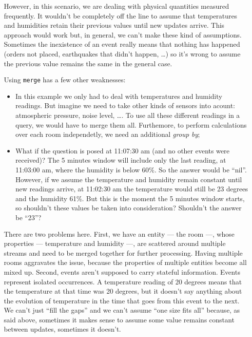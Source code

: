 \documentclass{report}
\begin{document}
However, in this scenario, we are dealing with physical quantities
measured frequently. It wouldn't be completely off the line to assume
that temperatures and humidities retain their previous values until
new updates arrive. This approach would work but, in general, we can't
make these kind of assumptions. Sometimes the inexistence of an event
really means that nothing has happened (orders not placed, earthquakes
that didn't happen, \ldots) so it's wrong to assume the previous value
remains the same in the general case.

Using \verb=merge= has a few other weaknesses:

\begin{itemize}
\item In this example we only had to deal with temperatures and
  humidity readings. But imagine we need to take other kinds of
  sensors into acount: atmospheric pressure, noise level, \ldots. To
  use all these different readings in a query, we would have to merge
  them all. Furthemore, to perform calculations over each room
  independetly, we need an additional \emph{group by};
\item What if the question is posed at 11:07:30 am (and no other
  events were received)? The 5 minutes window will include only the
  last reading, at 11:03:00 am, where the humidity is below 60\%. So
  the answer would be ``nil''. However, if we assume the temperature
  and humidity remain constant until new readings arrive, at 11:02:30
  am the temperature would still be 23 degrees and the humidity
  61\%. But this is the moment the 5 minutes window starts, so
  shouldn't these values be taken into consideration? Shouldn't the
  answer be ``23''?
\end{itemize}

There are two problems here. First, we have an entity --- the room
---, whose properties --- temperature and humidity ---, are scattered
around multiple streams and need to be merged together for further
processing. Having multiple rooms aggravates the issue, because the
properties of multiple entities become all mixed up. Second, events
aren't supposed to carry stateful information. Events represent
isolated occurrences. A temperature reading of 20 degrees means that
the temperature at that time was 20 degrees, but it doesn't say
anything about the evolution of temperature in the time that goes from
this event to the next. We can't just ``fill the gaps'' and we can't
assume ``one size fits all'' because, as said above, sometimes it
makes sense to assume some value remains constant between updates,
sometimes it doesn't.
\end{document}
